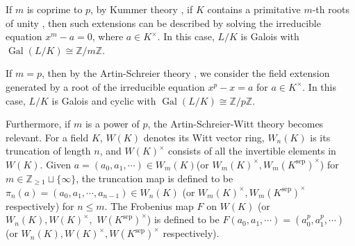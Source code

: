 \documentclass{proc-l}
\theoremstyle{definition}
\theoremstyle{remark}
\numberwithin{equation}{section}
\DeclareMathOperator{\Gal}{Gal}
\DeclareMathOperator{\sep}{sep}
\begin{document}
If $m$ is coprime to $p$, by Kummer theory \cite[Chapter VI]{MR1878556}, if $K$ contains a primitative $m$-th roots of unity , then such extensions can be described by solving the irreducible equation $x^m-a=0$, where $a\in K^\times$. In this case, $L/K$ is Galois with $\Gal(L/K)\cong\mathbb Z/m\mathbb Z$.

If $m=p$, then by the Artin-Schreier theory \cite[Chap X]{MR0554237}, we consider the field extension generated by a root of the irreducible equation $x^p-x=a$ for $a\in K^\times$. In this case, $L/K$ is Galois and cyclic with $\Gal(L/K)\cong\mathbb Z/p\mathbb Z.$ %

Furthermore, if $m$ is a power of $p$, the Artin-Schreier-Witt theory becomes relevant. For a field $K$, $W(K)$ denotes its Witt vector ring, $W_n(K)$ is its truncation of length $n$, and $W(K)^\times$ consists of all the invertible elements in $W(K)$.  Given $a=(a_0,a_1,\cdots)\in W_m(K)$(or $W_m(K)^\times,W_m(K^{\sep})^\times$) for $m\in\mathbb Z_{\geq1}\sqcup\{\infty\}$, the truncation map is defined to be $\pi_n(a)=(a_0,a_1,\cdots,a_{n-1})\in W_n(K)$ (or $W_m(K)^\times,W_m(K^{\sep})^\times$ respectively) for $n\leq m$. The Frobenius map $F$ on $W(K)$ (or $W_n(K),W(K)^\times,$ $W(K^{\sep})^\times$) is defined to be $F(a_0,a_1,\cdots)=(a_0^p,a_1^p,\cdots)$ (or $W_n(K),W(K)^\times, W(K^{\sep})^\times$ respectively). %
\end{document}
